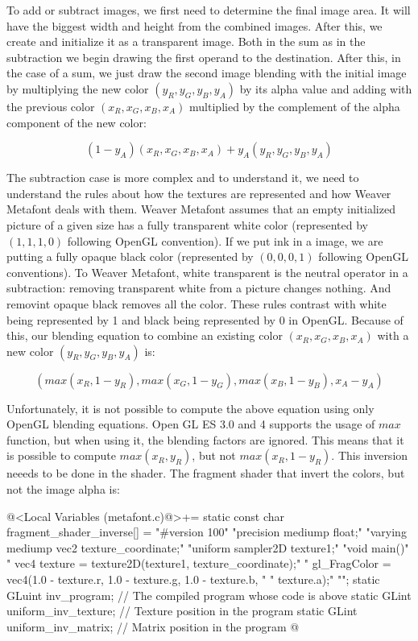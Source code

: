 {{{{{To add or subtract images, we first need to determine the final image
area. It will have the biggest width and height from the combined
images. After this, we create and initialize it as a transparent
image. Both in the sum as in the subtraction we begin drawing the
first operand to the destination. After this, in the case of a sum, we
just draw the second image blending with the initial image by
multiplying the new color $(y_R, y_G, y_B, y_A)$ by its alpha value
and adding with the previous color $(x_R, x_G, x_B, x_A)$ multiplied
by the complement of the alpha component of the new color:

$$(1-y_A)(x_R, x_G, x_B, x_A) + y_A(y_R, y_G, y_B, y_A)$$

The subtraction case is more complex and to understand it, we need to
understand the rules about how the textures are represented and how
Weaver Metafont deals with them. Weaver Metafont assumes that an empty
initialized picture of a given size has a fully transparent white
color (represented by $(1, 1, 1 ,0)$ following OpenGL convention). If
we put ink in a image, we are putting a fully opaque black color
(represented by $(0, 0, 0, 1)$ following OpenGL conventions). To
Weaver Metafont, white transparent is the neutral operator in a
subtraction: removing transparent white from a picture changes
nothing. And removint opaque black removes all the color. These rules
contrast with white being represented by 1 and black being represented
by 0 in OpenGL. Because of this, our blending equation to combine an
existing color $(x_R, x_G, x_B, x_A)$ with a new color $(y_R, y_G,
y_B, y_A)$ is:

$$
(max(x_R, 1-y_R), max(x_G, 1-y_G), max(x_B, 1-y_B), x_A-y_A)
$$

Unfortunately, it is not possible to compute the above equation using
only OpenGL blending equations. Open GL ES 3.0 and 4 supports the
usage of $max$ function, but when using it, the blending factors are
ignored. This means that it is possible to compute $max(x_R, y_R)$,
but not $max(x_R, 1- y_R)$. This inversion neeeds to be done in the
shader. The fragment shader that invert the colors, but not the image
alpha is:

\iniciocodigo
@<Local Variables (metafont.c)@>+=
static const char fragment_shader_inverse[] =
  "#version 100\n"
  "precision mediump float;\n"
  "varying mediump vec2 texture_coordinate;\n"
  "uniform sampler2D texture1;\n"
  "void main(){\n"
  "  vec4 texture = texture2D(texture1, texture_coordinate);\n"
  "  gl_FragColor = vec4(1.0 - texture.r, 1.0 - texture.g, 1.0 - texture.b, \n"
  "                      texture.a);\n"
  "}\n";
static GLuint inv_program; // The compiled program whose code is above
static GLint uniform_inv_texture; // Texture position in the program
static GLint uniform_inv_matrix; // Matrix position in the program
@
\fimcodigo

}}}}}
